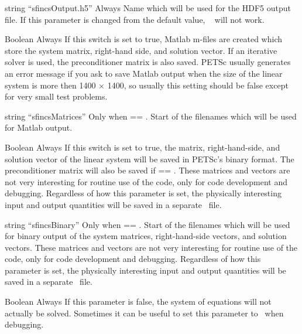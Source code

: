 \myhrule

{string}
{``sfincsOutput.h5''}
{Always}
{Name which will be used for the HDF5 output file.  If this parameter is changed from the default value, \sfincsScan~ will not work.}

\myhrule

{Boolean}
{\false}
{Always}
{If this switch is set to true, Matlab m-files are created which
 store the system matrix, right-hand side, and solution vector.  If an iterative solver is used,
 the preconditioner matrix is also saved.
 PETSc usually generates an error message if you ask to save Matlab output when
the size of the linear system is more then 1400 $\times$ 1400,
 so usually this setting should be false except for very small test problems.
}

\myhrule

{string}
{``sfincsMatrices''}
{Only when  == \true.}
{Start of the filenames which will be used for Matlab output.}

\myhrule

{Boolean}
{\false}
{Always}
{If this switch is set to true, the matrix, right-hand-side, and solution vector of the
linear system will be saved in PETSc's binary format.  
The preconditioner matrix will also
be saved if  == \true.}
These matrices and vectors are not very interesting for routine use of the code,
only for code development and debugging.
Regardless of how this parameter is set,
the physically interesting input and output quantities will be saved in a
separate \HDF~file.

\myhrule

{string}
{``sfincsBinary''}
{Only when  == \true.}
{Start of the filenames which will be used for binary output of the system
matrices, right-hand-side vectors, and solution vectors.
These matrices and vectors are not very interesting for routine use of the code,
only for code development and debugging.
Regardless of how this parameter is set,
the physically interesting input and output quantities will be saved in a
separate \HDF~file.
}

\myhrule

{Boolean}
{\true}
{Always}
{If this parameter is false, the system of equations will not actually be solved.
 Sometimes it can be useful to set this parameter to \false~when debugging.
}









